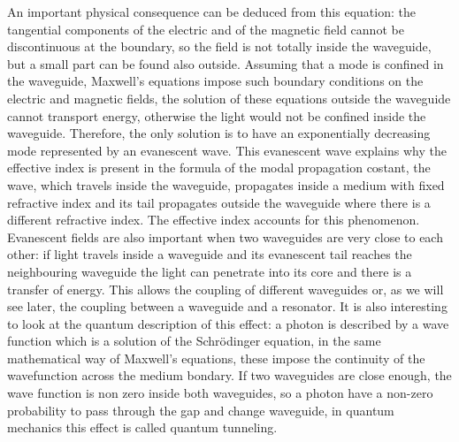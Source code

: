 An important physical consequence can be deduced from this equation: the tangential components of the electric and of the magnetic field cannot be discontinuous at the boundary, so the field is not totally inside the waveguide, but a small part can be found also outside. Assuming that a mode is confined in the waveguide, Maxwell's equations impose such boundary conditions on the electric and magnetic fields, the solution of these equations outside the waveguide cannot transport energy, otherwise the light would not be confined inside the waveguide. Therefore, the only solution is to have an exponentially decreasing mode represented by an evanescent wave. This evanescent wave explains why the effective index is present in the formula of the modal propagation costant, the wave, which travels inside the waveguide, propagates inside a medium with fixed refractive index and its tail propagates outside the waveguide where there is a different refractive index. The effective index accounts for this phenomenon.
Evanescent fields are also important when two waveguides are very close to each other: if light travels inside a waveguide and its evanescent tail reaches the neighbouring waveguide the light can penetrate into its core and there is a transfer of energy. This allows the coupling of different waveguides or, as we will see later, the coupling between a waveguide and a resonator. It is also interesting to look at the quantum description of this effect: a photon is described by a wave function which is a solution of the Schr{\"o}dinger equation, in the same mathematical way of Maxwell's equations, these impose the continuity of the wavefunction across the medium bondary. If two waveguides are close enough, the wave function is non zero inside both waveguides, so a photon have a non-zero probability to pass through the gap and change waveguide, in quantum mechanics this effect is called quantum tunneling. 
